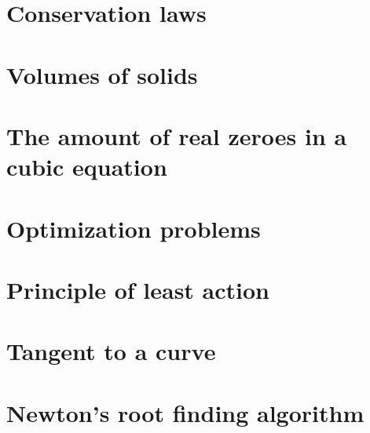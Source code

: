 \section{Conservation laws}

\section{Volumes of solids}

\section{The amount of real zeroes in a cubic equation}

\section{Optimization problems}

\section{Principle of least action}

\section{Tangent to a curve}

\section{Newton's root finding algorithm}